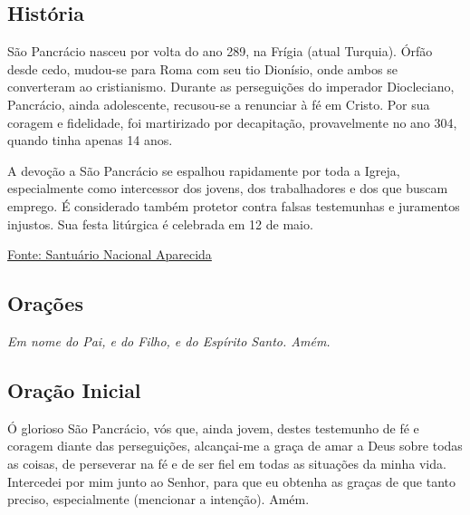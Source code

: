 \documentclass[18pt]{article}
\begin{document}
\begin{justify}
\begin{center}
\section{História}\label{sec:História}
\end{center}

São Pancrácio nasceu por volta do ano 289, na Frígia (atual Turquia). Órfão desde cedo, mudou-se para Roma com seu tio Dionísio, onde ambos se converteram ao cristianismo. Durante as perseguições do imperador Diocleciano, Pancrácio, ainda adolescente, recusou-se a renunciar à fé em Cristo. Por sua coragem e fidelidade, foi martirizado por decapitação, provavelmente no ano 304, quando tinha apenas 14 anos.

A devoção a São Pancrácio se espalhou rapidamente por toda a Igreja, especialmente como intercessor dos jovens, dos trabalhadores e dos que buscam emprego. É considerado também protetor contra falsas testemunhas e juramentos injustos. Sua festa litúrgica é celebrada em 12 de maio.

\vfill

\begin{center}
\href{https://www.a12.com/santuario/noticias/sao-pancracio-o-santo-dos-empregados-e-dos-necessitados}{Fonte: Santuário Nacional Aparecida}
\end{center}
\end{justify}


\newpage

\begin{center}
\section{Orações}\label{sec:Orações}
\textit{Em nome do Pai, e do Filho, e do Espírito Santo. Amém.}
\end{center}

\subsection*{Oração Inicial}
Ó glorioso São Pancrácio, vós que, ainda jovem, destes testemunho de fé e coragem diante das perseguições, alcançai-me a graça de amar a Deus sobre todas as coisas, de perseverar na fé e de ser fiel em todas as situações da minha vida. Intercedei por mim junto ao Senhor, para que eu obtenha as graças de que tanto preciso, especialmente (mencionar a intenção). Amém.
\end{document}
